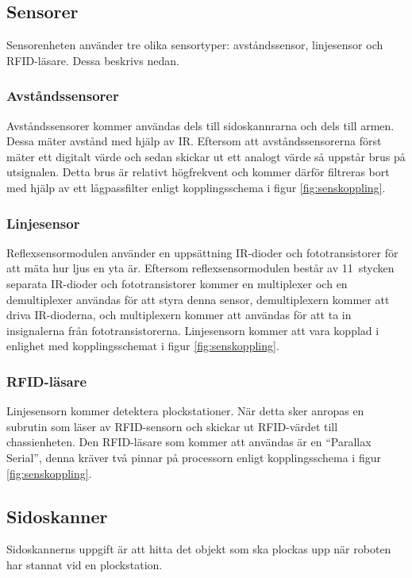\subsection{Sensorer}
Sensorenheten använder tre olika sensortyper: avståndssensor, linjesensor och RFID-läsare. Dessa beskrivs nedan. 

\subsubsection{Avståndssensorer}
Avståndssensorer kommer användas dels till sidoskannrarna och dels till armen. Dessa mäter avstånd med hjälp av IR. Eftersom att avståndssensorerna först mäter ett digitalt värde och sedan skickar ut ett analogt värde så uppstår brus på utsignalen. Detta brus är relativt högfrekvent och kommer därför filtreras bort med hjälp av ett lågpassfilter enligt kopplingsschema i figur \ref{fig:senskoppling}. 


\subsubsection{Linjesensor}
Reflexsensormodulen använder en uppsättning IR-dioder och fototransistorer för att mäta hur ljus en yta är. Eftersom reflexsensormodulen består av 11~stycken separata IR-dioder och fototransistorer kommer en multiplexer och en demultiplexer användas för att styra denna sensor, demultiplexern kommer att driva IR-dioderna, och multiplexern kommer att användas för att ta in insignalerna från fototransistorerna. Linjesensorn kommer att vara kopplad i enlighet med kopplingsschemat i figur \ref{fig:senskoppling}.


\subsubsection{RFID-läsare}
Linjesensorn kommer detektera plockstationer. När detta sker anropas en subrutin som läser av RFID-sensorn och skickar ut RFID-värdet till chassienheten. Den RFID-läsare som kommer att användas är en “Parallax Serial”, denna kräver två pinnar på processorn enligt kopplingsschema i figur \ref{fig:senskoppling}.


\subsection{Sidoskanner}
Sidoskannerns uppgift är att hitta det objekt som ska plockas upp när roboten har stannat vid en plockstation. 


